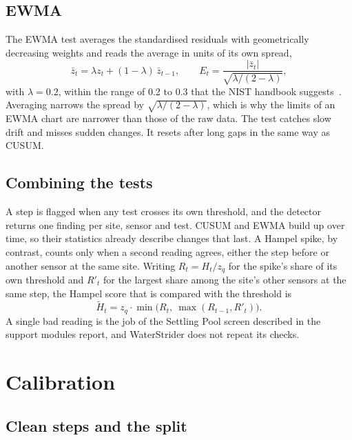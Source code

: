 \documentclass{article}
\begin{document}
\subsection{EWMA}
\label{sec:ewma}

The EWMA test averages the standardised residuals with geometrically
decreasing weights and reads the average in units of its own spread,
\begin{equation}
  \bar{z}_{t} = \lambda z_{t} + (1 - \lambda)\, \bar{z}_{t-1}, \qquad
  E_{t} = \frac{|\bar{z}_{t}|}{\sqrt{\lambda / (2 - \lambda)}} ,
\end{equation}
with $\lambda = 0.2$, within the range of 0.2 to 0.3 that the NIST handbook
suggests~\citep{nisthandbookewma}. Averaging narrows the spread by
$\sqrt{\lambda / (2 - \lambda)}$, which is why the limits of an EWMA chart are
narrower than those of the raw data. The test catches slow drift and misses
sudden changes. It resets after long gaps in the same way as CUSUM.

\subsection{Combining the tests}
\label{sec:combination}

A step is flagged when any test crosses its own threshold, and the detector
returns one finding per site, sensor and test. CUSUM and EWMA build up over
time, so their statistics already describe changes that last. A Hampel spike,
by contrast, counts only when a second reading agrees, either the step before
or another sensor at the same site. Writing $R_{t} = H_{t} / z_{q}$ for the
spike's share of its own threshold and $R'_{t}$ for the largest share among
the site's other sensors at the same step, the Hampel score that is compared
with the threshold is
\begin{equation}
  \tilde{H}_{t} = z_{q} \cdot \min\!\big(R_{t},\ \max(R_{t-1}, R'_{t})\big).
\end{equation}
A single bad reading is the job of the Settling Pool screen described in the
support modules report, and WaterStrider does not repeat its checks.

\section{Calibration}
\label{sec:calibration}

\subsection{Clean steps and the split}
\label{sec:clean}
\end{document}
